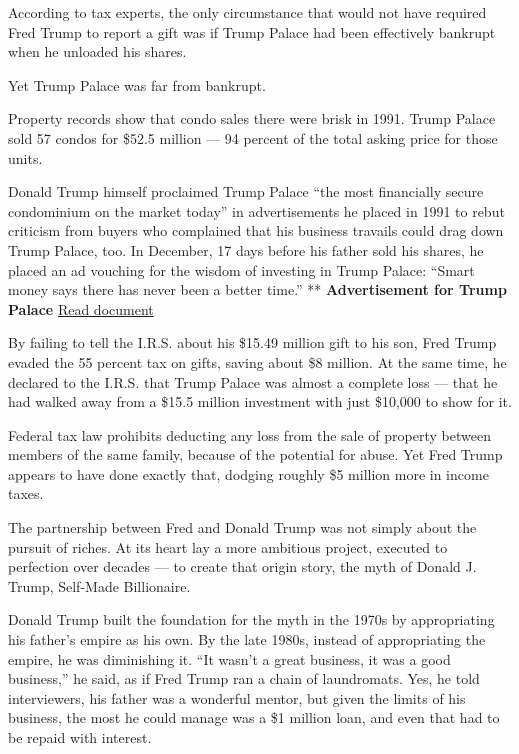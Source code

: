 According to tax experts, the only circumstance that would not have
required Fred Trump to report a gift was if Trump Palace had been
effectively bankrupt when he unloaded his shares.

Yet Trump Palace was far from bankrupt.

Property records show that condo sales there were brisk in 1991. Trump
Palace sold 57 condos for \$52.5 million --- 94 percent of the total
asking price for those units.

Donald Trump himself proclaimed Trump Palace ``the most financially
secure condominium on the market today'' in advertisements he placed in
1991 to rebut criticism from buyers who complained that his business
travails could drag down Trump Palace, too. In December, 17 days before
his father sold his shares, he placed an ad vouching for the wisdom of
investing in Trump Palace: ``Smart money says there has never been a
better time.'' ** \textbf{Advertisement for Trump Palace}
\href{https://int.graylady3jvrrxbe.onion/data/documenthelper/128-trump-palace-nyt-ad/fd5972d9e5e9f6edcf53/optimized/full.pdf\#page=1}{Read
document}

By failing to tell the I.R.S. about his \$15.49 million gift to his son,
Fred Trump evaded the 55 percent tax on gifts, saving about \$8 million.
At the same time, he declared to the I.R.S. that Trump Palace was almost
a complete loss --- that he had walked away from a \$15.5 million
investment with just \$10,000 to show for it.

Federal tax law prohibits deducting any loss from the sale of property
between members of the same family, because of the potential for abuse.
Yet Fred Trump appears to have done exactly that, dodging roughly \$5
million more in income taxes.

The partnership between Fred and Donald Trump was not simply about the
pursuit of riches. At its heart lay a more ambitious project, executed
to perfection over decades --- to create that origin story, the myth of
Donald J. Trump, Self-Made Billionaire.

Donald Trump built the foundation for the myth in the 1970s by
appropriating his father's empire as his own. By the late 1980s, instead
of appropriating the empire, he was diminishing it. ``It wasn't a great
business, it was a good business,'' he said, as if Fred Trump ran a
chain of laundromats. Yes, he told interviewers, his father was a
wonderful mentor, but given the limits of his business, the most he
could manage was a \$1 million loan, and even that had to be repaid with
interest.

